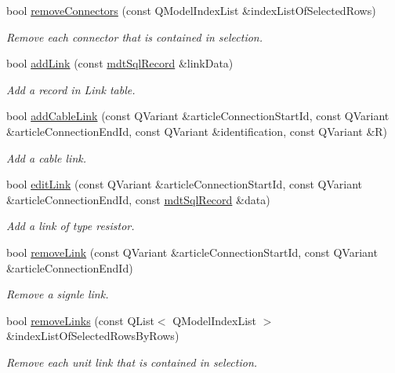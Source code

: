 \begin{DoxyCompactItemize}
bool \hyperlink{classmdt_cl_article_a76b8a9d9c0faf7081632fa94e25d58d3}{remove\-Connectors} (const Q\-Model\-Index\-List \&index\-List\-Of\-Selected\-Rows)
\begin{DoxyCompactList}\small\item\em Remove each connector that is contained in selection. \end{DoxyCompactList}\item 
bool \hyperlink{classmdt_cl_article_aa438fa2c759a091341eea76ffda6eef3}{add\-Link} (const \hyperlink{classmdt_sql_record}{mdt\-Sql\-Record} \&link\-Data)
\begin{DoxyCompactList}\small\item\em Add a record in Link table. \end{DoxyCompactList}\item 
bool \hyperlink{classmdt_cl_article_a0ed8ad64cafb5b69c1f83875818136e5}{add\-Cable\-Link} (const Q\-Variant \&article\-Connection\-Start\-Id, const Q\-Variant \&article\-Connection\-End\-Id, const Q\-Variant \&identification, const Q\-Variant \&R)
\begin{DoxyCompactList}\small\item\em Add a cable link. \end{DoxyCompactList}\item 
bool \hyperlink{classmdt_cl_article_a3c627720a87e6003bb78c0727ec2ba64}{edit\-Link} (const Q\-Variant \&article\-Connection\-Start\-Id, const Q\-Variant \&article\-Connection\-End\-Id, const \hyperlink{classmdt_sql_record}{mdt\-Sql\-Record} \&data)
\begin{DoxyCompactList}\small\item\em Add a link of type resistor. \end{DoxyCompactList}\item 
bool \hyperlink{classmdt_cl_article_a4e26282c7605f756519050fee3858134}{remove\-Link} (const Q\-Variant \&article\-Connection\-Start\-Id, const Q\-Variant \&article\-Connection\-End\-Id)
\begin{DoxyCompactList}\small\item\em Remove a signle link. \end{DoxyCompactList}\item 
bool \hyperlink{classmdt_cl_article_ae2dda20b31bafbc1ee6dcce1db1134c7}{remove\-Links} (const Q\-List$<$ Q\-Model\-Index\-List $>$ \&index\-List\-Of\-Selected\-Rows\-By\-Rows)
\begin{DoxyCompactList}\small\item\em Remove each unit link that is contained in selection. \end{DoxyCompactList}\end{DoxyCompactItemize}
